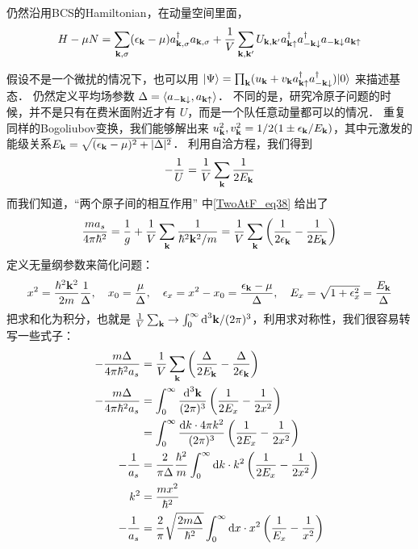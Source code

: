 
仍然沿用BCS的Hamiltonian，在动量空间里面，
\begin{equation}
H-\mu N = \sum_{{\bf k},\sigma}(\epsilon_{\bf k}-\mu)a^\dagger_{{\bf k},\sigma}a_{\bf k,\sigma}+\frac{1}{V}\sum_{\bf k, k'}U_{\bf k, k'}a^\dagger_{\bf k\uparrow}a^\dagger_{-\bf k\downarrow}a_{-\bf k\downarrow}a_{\bf k\uparrow}
\end{equation}

假设不是一个微扰的情况下，也可以用 $|\Psi\rangle = \prod_{\bf k}(u_{\bf k}+v_{\bf k}a^\dagger_{\bf k\uparrow}a^\dagger_{-\bf k\downarrow})|0\rangle$ 来描述基态． 仍然定义平均场参数 $\Delta = \langle a_{-\bf k\downarrow},a_{\bf k\uparrow}\rangle$． 不同的是，研究冷原子问题的时候，并不是只有在费米面附近才有 $U$，而是一个队任意动量都可以的情况． 重复同样的Bogoliubov变换，我们能够解出来 $u_{\bf k}^2, v_{\bf k}^2 = 1/2(1\pm\epsilon_{\bf k}/E_{\bf k})$，其中元激发的能级关系$E_{\bf k}=\sqrt{(\epsilon_{\bf k}-\mu)^2+|\Delta|^2}$． 利用自洽方程，我们得到
\begin{equation}
-\frac{1}{U} = \frac{1}{V}\sum_{\bf k}\frac{1}{2E_{\bf k}}
\end{equation}
而我们知道，“两个原子间的相互作用” 中\autoref{TwoAtF_eq38} 给出了
\begin{equation}
\frac{ma_s}{4\pi\hbar^2} = \frac{1}{g} + \frac{1}{V}\sum_{\bf k}\frac{1}{\hbar^2{\bf k}^2/m} = \frac{1}{V}\sum_{\bf k}\left(\frac{1}{2\epsilon_{\bf k}} - \frac{1}{2E_{\bf k}}\right)
\end{equation}
定义无量纲参数来简化问题：
\begin{equation}
x^2 = \frac{\hbar^2{\bf k}^2}{2m}\frac{1}{\Delta},\quad x_0 = \frac{\mu}{\Delta},\quad \epsilon_x = x^2-x_0 = \frac{\epsilon_{\bf k}-\mu}{\Delta},\quad E_x = \sqrt{1+\epsilon_x^2} = \frac{E_{\bf k}}{\Delta}
\end{equation}
把求和化为积分，也就是 $\frac{1}{V}\sum_{\bf k}\to\int_0^\infty \text{d}^3{\bf k}/(2\pi)^3$，利用求对称性，我们很容易转写一些式子：
\begin{equation}
\begin{split}
-\frac{m\Delta}{4\pi\hbar^2 a_s} &=\frac{1}{V}\sum_{\bf k}\left(\frac{\Delta}{2E_{\bf k}} - \frac{\Delta}{2\epsilon_{\bf k}}\right)\\
-\frac{m\Delta}{4\pi\hbar^2 a_s} &=\int_0^\infty\frac{\text{d}^3{\bf k}}{(2\pi)^3}\left(\frac{1}{2E_x} - \frac{1}{2x^2}\right) \\
&=\int_0^\infty\frac{\text{d}k\cdot 4\pi k^2}{(2\pi)^3}\left(\frac{1}{2E_x} - \frac{1}{2x^2}\right)\\
-\frac{1}{a_s} &= \frac{2}{\pi\Delta}\frac{\hbar^2}{m}\int_0^\infty\text{d}k\cdot k^2\left(\frac{1}{2E_x} - \frac{1}{2x^2}\right)\\
k^2 &= \frac{mx^2}{\hbar^2}\\
-\frac{1}{a_s} &= \frac{2}{\pi}\sqrt{\frac{2m\Delta}{\hbar^2}}\int_0^\infty \text{d}x\cdot x^2\left(\frac{1}{E_x}-\frac{1}{x^2}\right)
\end{split}
\end{equation}
